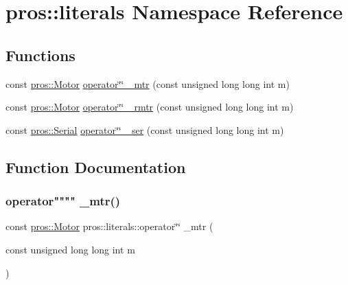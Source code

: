 \hypertarget{namespacepros_1_1literals}{}\section{pros\+:\+:literals Namespace Reference}
\label{namespacepros_1_1literals}
\subsection*{Functions}
\begin{DoxyCompactItemize}
\item 
const \hyperlink{classpros_1_1Motor}{pros\+::\+Motor} \hyperlink{namespacepros_1_1literals_ab19f91c5296c3e2a3c472857a0323f19}{operator\char`\"{}\char`\"{} \+\_\+mtr} (const unsigned long long int m)
\item 
const \hyperlink{classpros_1_1Motor}{pros\+::\+Motor} \hyperlink{namespacepros_1_1literals_ae119de976796a7e955cb4e9ee580f137}{operator\char`\"{}\char`\"{} \+\_\+rmtr} (const unsigned long long int m)
\item 
const \hyperlink{classpros_1_1Serial}{pros\+::\+Serial} \hyperlink{namespacepros_1_1literals_a4641b7d1ffd17d105b953d25da9ed40b}{operator\char`\"{}\char`\"{} \+\_\+ser} (const unsigned long long int m)
\end{DoxyCompactItemize}


\subsection{Function Documentation}
\mbox{\label{namespacepros_1_1literals_ab19f91c5296c3e2a3c472857a0323f19}} 
\subsubsection{\texorpdfstring{operator"""" \+\_\+mtr()}{operator"" \_mtr()}}
{\footnotesize\ttfamily const \hyperlink{classpros_1_1Motor}{pros\+::\+Motor} pros\+::literals\+::operator\char`\"{}\char`\"{} \+\_\+mtr (\begin{DoxyParamCaption}\item[{const unsigned long long int}]{m }\end{DoxyParamCaption})}

